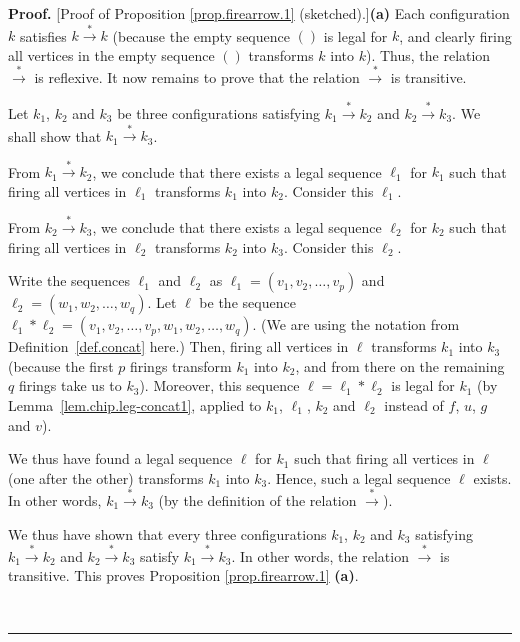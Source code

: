\documentclass[numbers=enddot,12pt,final,onecolumn,notitlepage]{scrartcl}%
\theoremstyle{definition}
\newenvironment{proof}[1][Proof]{\noindent\textbf{#1.} }{\ \rule{0.5em}{0.5em}}
\begin{document}
\begin{proof}
[Proof of Proposition \ref{prop.firearrow.1} (sketched).]\textbf{(a)} Each
configuration $k$ satisfies $k\overset{\ast}{\rightarrow}k$ (because the empty
sequence $\left(  {}\right)  $ is legal for $k$, and clearly firing all
vertices in the empty sequence $\left(  {}\right)  $ transforms $k$ into $k$).
Thus, the relation $\overset{\ast}{\rightarrow}$ is reflexive. It now remains
to prove that the relation $\overset{\ast}{\rightarrow}$ is transitive.

Let $k_{1}$, $k_{2}$ and $k_{3}$ be three configurations satisfying
$k_{1}\overset{\ast}{\rightarrow}k_{2}$ and $k_{2}\overset{\ast}{\rightarrow
}k_{3}$. We shall show that $k_{1}\overset{\ast}{\rightarrow}k_{3}$.

From $k_{1}\overset{\ast}{\rightarrow}k_{2}$, we conclude that there exists a
legal sequence $\ell_{1}$ for $k_{1}$ such that firing all vertices in
$\ell_{1}$ transforms $k_{1}$ into $k_{2}$. Consider this $\ell_{1}$.

From $k_{2}\overset{\ast}{\rightarrow}k_{3}$, we conclude that there exists a
legal sequence $\ell_{2}$ for $k_{2}$ such that firing all vertices in
$\ell_{2}$ transforms $k_{2}$ into $k_{3}$. Consider this $\ell_{2}$.

Write the sequences $\ell_{1}$ and $\ell_{2}$ as $\ell_{1}=\left(  v_{1}%
,v_{2},\ldots,v_{p}\right)  $ and $\ell_{2}=\left(  w_{1},w_{2},\ldots
,w_{q}\right)  $. Let $\ell$ be the sequence $\ell_1 \ast \ell_2
= \left(  v_{1},v_{2},\ldots ,v_{p},w_{1},w_{2},\ldots,w_{q}\right)  $.
(We are using the notation from Definition~\ref{def.concat} here.)
Then, firing all vertices in
$\ell$ transforms $k_{1}$ into $k_{3}$ (because the first $p$ firings
transform $k_{1}$ into $k_{2}$, and from there on the remaining $q$ firings
take us to $k_{3}$). Moreover, this sequence
$\ell = \ell_1 \ast \ell_2$ is legal for $k_1$
(by Lemma~\ref{lem.chip.leg-concat1}, applied to
$k_1$, $\ell_1$, $k_2$ and $\ell_2$
instead of $f$, $u$, $g$ and $v$).

We thus have found a legal sequence $\ell$ for $k_{1}$ such that firing all
vertices in $\ell$ (one after the other) transforms $k_{1}$ into $k_{3}$.
Hence, such a legal sequence $\ell$ exists. In other words, $k_{1}%
\overset{\ast}{\rightarrow}k_{3}$ (by the definition of the relation
$\overset{\ast}{\rightarrow}$).

We thus have shown that every three configurations $k_{1}$, $k_{2}$ and
$k_{3}$ satisfying $k_{1}\overset{\ast}{\rightarrow}k_{2}$ and $k_{2}%
\overset{\ast}{\rightarrow}k_{3}$ satisfy $k_{1}\overset{\ast}{\rightarrow
}k_{3}$. In other words, the relation $\overset{\ast}{\rightarrow}$ is
transitive. This proves Proposition \ref{prop.firearrow.1} \textbf{(a)}.


\end{proof}
\end{document}

